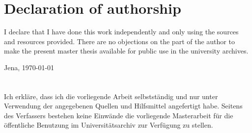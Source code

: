 \documentclass[12pt,a4paper,english]{article}
\begin{document}
\newpage
\pagestyle{empty}
\twocolumn
\section*{Declaration of authorship}
I declare that I have done this work independently and only using the sources and resources provided. There are no objections on the part of the author to make the present master thesis available for public use in the university archives.
\vspace*{3cm}

Jena, \today
\newpage
\section*{ }
Ich erkläre, dass ich die vorliegende Arbeit selbstständig und nur unter Verwendung der angegebenen Quellen und Hilfsmittel angefertigt habe. Seitens des Verfassers bestehen keine Einwände die vorliegende Masterarbeit für die öffentliche Benutzung im Universitätsarchiv zur Verfügung zu stellen.


\end{document}
